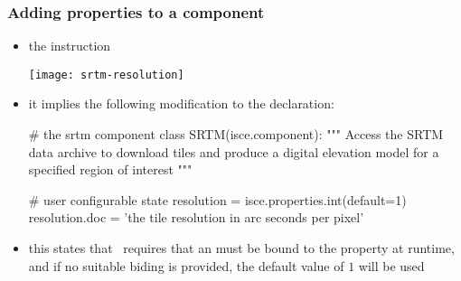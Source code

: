 \begin{frame}[fragile]
%
  \frametitle{Adding properties to a component}
%
  \begin{itemize}
%
  \item the instruction
%
    \begin{center}
      \texttt{[image: srtm-resolution]}
    \end{center}
%
  \item it implies the following modification to the  declaration:
%
    \begin{ipython}[firstnumber=4]{}
# the srtm component
class SRTM(isce.component):
    """
    Access the SRTM data archive to download tiles and produce
    a digital elevation model for a specified region of interest
    """

    # user configurable state
    resolution = isce.properties.int(default=1)
    resolution.doc = 'the tile resolution in arc seconds per pixel'

    \end{ipython}
%
  \item this states that \srtm\ requires that an  must be bound to the property
     at runtime, and if no suitable biding is provided, the default value of
    $1$ will be used
%
  \end{itemize}
%
\end{frame}

